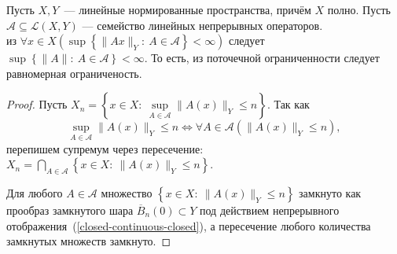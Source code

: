 \begin{theorem}\label{Banach-Steingaus}
Пусть \(X, Y\)~--- линейные нормированные пространства, причём \(X\) полно. Пусть \(\mathcal{A} \subseteq \mathcal{L}(X, Y)\) --- семейство линейных непрерывных операторов.\\
 из \(\forall x \in X \left(\sup\left\{\|Ax\|_Y:\: A \in \mathcal{A} \right\} < \infty \right)\) следует \(\sup\left\{\|A\|:\: A \in \mathcal{A} \right\} < \infty\). То есть, из поточечной ограниченности следует равномерная ограниченость.
\end{theorem}
\begin{proof} Пусть
\(X_n = \left\{x \in X:\: \sup\limits_{A \in \mathcal{A}} \|A(x)\|_Y \leqslant n \right\}\).
Так как 
\[\sup\limits_{A \in \mathcal{A}} \|A(x)\|_Y \leqslant n \Leftrightarrow \forall A \in \mathcal{A} \left(\|A(x)\|_Y \leqslant n \right),\]
перепишем супремум через пересечение: \(X_n = \bigcap\limits_{A \in \mathcal{A}} \left\{x \in X:\: \|A(x)\|_Y \leqslant n \right\}\).

Для любого \(A \in \mathcal{A}\) множество \(\left\{x \in X:\: \|A(x)\|_Y \leqslant n \right\}\) замкнуто как прообраз замкнутого шара \(\overline{B}_n(0) \subset Y\) под действием непрерывного отображения~(\ref{closed-continuous-closed}), а пересечение любого количества замкнутых множеств замкнуто.


\end{proof}
